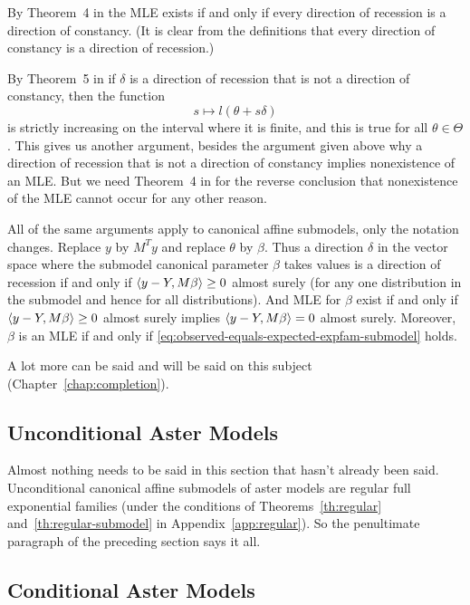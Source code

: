 By Theorem~{4} in \citet{geyer-gdor} the MLE exists if and only if
every direction of recession is a direction of constancy.
(It is clear from the definitions that every direction of constancy is
a direction of recession.)

By Theorem~{5} in \citet{geyer-gdor} if $\delta$ is a direction of recession
that is not a direction of constancy, then the function
$$
   s \mapsto l(\theta + s \delta)
$$
is strictly increasing on the interval where it is finite, and this is
true for all $\theta \in \Theta$.  This gives us another argument,
besides the argument given above why a direction of recession that is
not a direction of constancy implies nonexistence of an MLE.
But we need Theorem~{4} in \citet{geyer-gdor} for the reverse conclusion
that nonexistence of the MLE cannot occur for any other reason.

All of the same arguments apply to canonical affine submodels,
only the notation changes.  Replace $y$ by $M^T y$ and replace $\theta$ by
$\beta$.  Thus a direction $\delta$ in the vector space where the submodel
canonical parameter $\beta$ takes values is a direction of recession if and
only if $\langle y - Y, M \beta \rangle \ge 0$ almost surely (for any one distribution
in the submodel and hence for all distributions).  And MLE for $\beta$ exist
if and only if $\langle y - Y, M \beta \rangle \ge 0$ almost surely
implies $\langle y - Y, M \beta \rangle = 0$ almost surely.
Moreover, $\beta$ is an MLE if and only if
\eqref{eq:observed-equals-expected-expfam-submodel} holds.

A lot more can be said and will be said on this subject
(Chapter~\ref{chap:completion}).

\subsection{Unconditional Aster Models}

Almost nothing needs to be said in this section that hasn't already been said.
Unconditional canonical affine submodels of aster models are regular full
exponential families (under the conditions of Theorems~\ref{th:regular}
and~\ref{th:regular-submodel} in Appendix~\ref{app:regular}).  So the
penultimate paragraph of the preceding section says it all.

\subsection{Conditional Aster Models}
\label{sec:conditional-aster-model-mle}


